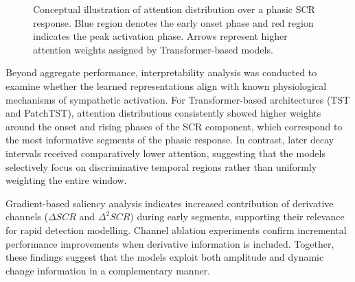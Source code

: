 \documentclass[runningheads]{llncs}
\begin{document}
\begin{figure}[t]
\centering
{}
\caption{Conceptual illustration of attention distribution over a phasic SCR response. Blue region denotes the early onset phase and red region indicates the peak activation phase. Arrows represent higher attention weights assigned by Transformer-based models.}
\label{fig:attention_concept}
\end{figure}


Beyond aggregate performance, interpretability analysis was conducted to examine whether the learned representations align with known physiological mechanisms of sympathetic activation. For Transformer-based architectures (TST and PatchTST), attention distributions consistently showed higher weights around the onset and rising phases of the SCR component, which correspond to the most informative segments of the phasic response. In contrast, later decay intervals received comparatively lower attention, suggesting that the models selectively focus on discriminative temporal regions rather than uniformly weighting the entire window.

Gradient-based saliency analysis indicates increased contribution of derivative channels ($\Delta SCR$ and $\Delta^2 SCR$) during early segments, supporting their relevance for rapid detection modelling. Channel ablation experiments confirm incremental performance improvements when derivative information is included. Together, these findings suggest that the models exploit both amplitude and dynamic change information in a complementary manner.
\end{document}

